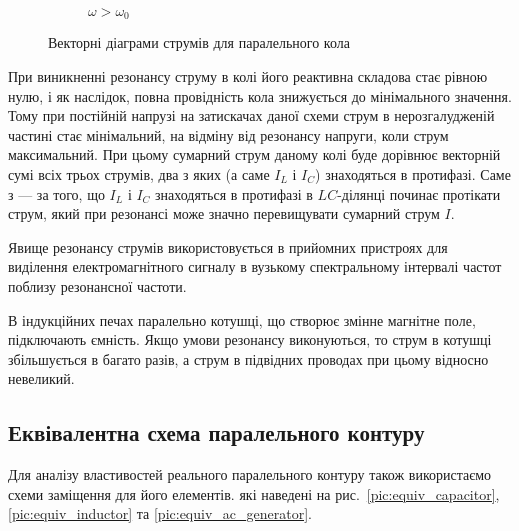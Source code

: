 \documentclass[]{LabWork}
\begin{document}
\begin{figure}[h!]
\begin{subfigure}[b]{0.30\linewidth}
		\caption{$\omega > \omega_0$}
		\label{pic:P-vector_diagrams>}
	\end{subfigure}
	\caption{Векторні діаграми струмів для паралельного кола}
	\label{pic:P-vector_diagrams}
\end{figure}

При виникненні резонансу струму в колі його  реактивна складова стає рівною нулю, і як наслідок, повна провідність кола знижується до мінімального значення. Тому при постійній напрузі на затискачах даної схеми струм в нерозгалудженій частині  стає мінімальний, на відміну від резонансу напруги, коли струм максимальний. При цьому сумарний струм даному колі буде дорівнює векторній сумі всіх трьох струмів, два з яких (а саме $I_L$ і $I_C$) знаходяться в протифазі. Саме з --- за того, що $I_L$ і $I_C$ знаходяться в протифазі в $LC$-ділянці починає протікати струм, який при резонансі може значно перевищувати сумарний струм $I$.

\noindent\bigskip%
\begin{More}

	Явище резонансу струмів використовується в прийомних пристроях для виділення електромагнітного сигналу в вузькому спектральному інтервалі частот поблизу резонансної частоти.

	В індукційних печах паралельно котушці, що створює змінне магнітне поле, підключають ємність. Якщо умови резонансу виконуються, то струм в котушці збільшується в багато разів, а струм в підвідних проводах при цьому відносно невеликий.
\end{More}

\subsection{Еквівалентна схема паралельного контуру}

Для аналізу властивостей реального паралельного контуру також використаємо схеми заміщення для його елементів. які наведені на рис.~\ref{pic:equiv_capacitor}, \ref{pic:equiv_inductor} та \ref{pic:equiv_ac_generator}.
\end{document}

